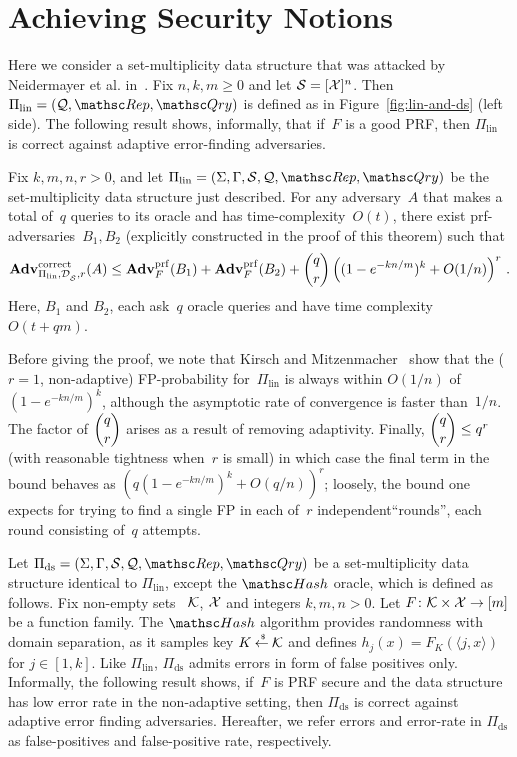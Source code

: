\section{Achieving Security Notions}



Here we consider a set-multiplicity data structure that was attacked by Neidermayer et al. in~\cite{xxx}. Fix $n,k,m \geq 0$ and let $\mathcal{S}=[{\cal X}]^n$.  Then $\Pi_{\mathrm{lin}}= (\calQ,\Rep, \Qry)$ is defined as in Figure~\ref{fig:lin-and-ds} (left side).  The following result shows, informally, that if~$F$ is a good PRF, then $\Pi_\mathrm{lin}$ is correct against adaptive error-finding adversaries. 

\begin{theorem}\label{thm1}
Fix $k,m,n,r>0$, and let $\Pi_{\mathrm{lin}}= (\Sigma,\Gamma,\calS,\calQ,\Rep, \Qry)$ be the set-multiplicity data structure just described. For any adversary~$A$ that makes a total of~$q$ queries to its oracle and has time-complexity~$O(t)$, there exist prf-adversaries~$B_1,B_2$ (explicitly constructed in the proof of this theorem) such that
\[
\mathrm{\mathbf{Adv}}^{\mathrm{correct}}_{\Pi_{\mathrm{lin}},\mathcal{D}_{{\cal S}}^{},r}(A) \leq  \mathbf{Adv}^{\mathrm{prf}}_{F}(B_1) + \mathbf{Adv}^{\mathrm{prf}}_{F}(B_2)  +{\dbinom{q}{r}} \left( (1-e^{-kn/m})^k + O(1/n) \right)^r\,.
\]
Here, $B_1$ and $B_2$, each ask~$q$ oracle queries and have time complexity~$O(t+qm)$.
\end{theorem}
Before giving the proof, we note that Kirsch and Mitzenmacher~\cite{xxx} show
that the ($r=1$, non-adaptive) FP-probability for~$\Pi_\mathrm{lin}$ is
always within $O(1/n)$ of $(1-e^{-kn/m})^k$, although the asymptotic
rate of convergence is faster than~$1/n$.  The factor of $\dbinom{q}{r}$ arises as a result
of removing adaptivity.  Finally, $\dbinom{q}{r} \leq q^r$ (with
reasonable tightness when~$r$ is small) in which case the final term in the bound behaves as
$(q (1-e^{-kn/m})^k + O(q/n) )^r$; loosely, the bound one expects for
trying to find a single FP in each of~$r$ independent``rounds'', each round
consisting of~$q$ attempts.

Let $\Pi_{\mathrm{ds}}= (\Sigma,\Gamma,\calS,\calQ,\Rep, \Qry)$ be a set-multiplicity data structure identical to $\Pi_{\mathrm{lin}}$, except the $\Hash$ oracle, which is defined as follows. Fix non-empty sets ~${\cal K}$, ${\cal X}$ and integers $k,m,n>0$.  Let $F\colon\mathcal{K} \times {\cal X} \to [m]$ be a function family.  The $\Hash$ algorithm provides randomness with domain separation, as it samples key $K {\:\stackrel{{\scriptscriptstyle \hspace{0.2em}\$}} {\leftarrow}\:} \mathcal{K}$ and defines $h_j(x) = F_K(\langle j,x \rangle) $ for $j \in [1,k]$. Like $\Pi_{\mathrm{lin}}$, $\Pi_{\mathrm{ds}}$ admits errors in form of false positives only. Informally, the following result shows, if~$F$ is PRF secure and the data structure has low error rate in the non-adaptive setting, then $\Pi_{\mathrm{ds}}$ is correct against adaptive error finding adversaries. Hereafter, we refer errors and error-rate in $\Pi_{\mathrm{ds}}$ as false-positives and false-positive rate, respectively.


